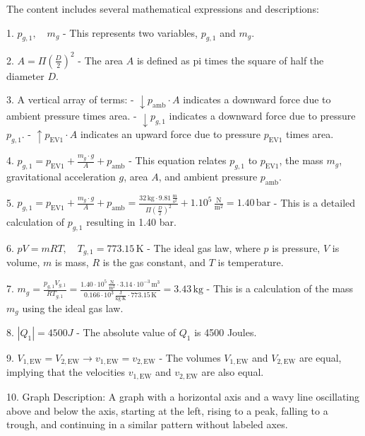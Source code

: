 The content includes several mathematical expressions and descriptions:

1. \( p_{g,1}, \quad m_g \) - This represents two variables, \( p_{g,1} \) and \( m_g \).

2. \( A = \Pi \left( \frac{D}{2} \right)^2 \) - The area \( A \) is defined as pi times the square of half the diameter \( D \).

3. A vertical array of terms:
   - \( \downarrow p_{\text{amb}} \cdot A \) indicates a downward force due to ambient pressure times area.
   - \( \downarrow p_{g,1} \) indicates a downward force due to pressure \( p_{g,1} \).
   - \( \uparrow p_{\text{EV1}} \cdot A \) indicates an upward force due to pressure \( p_{\text{EV1}} \) times area.

4. \( p_{g,1} = p_{\text{EV1}} + \frac{m_g \cdot g}{A} + p_{\text{amb}} \) - This equation relates \( p_{g,1} \) to \( p_{\text{EV1}} \), the mass \( m_g \), gravitational acceleration \( g \), area \( A \), and ambient pressure \( p_{\text{amb}} \).

5. \( p_{g,1} = p_{\text{EV1}} + \frac{m_g \cdot g}{A} + p_{\text{amb}} = \frac{32 \, \text{kg} \cdot 9.81 \, \frac{\text{m}}{\text{s}^2}}{\Pi \left( \frac{D}{2} \right)^2} + 1.10^5 \, \frac{\text{N}}{\text{m}^2} = \boxed{1.40 \, \text{bar}} \) - This is a detailed calculation of \( p_{g,1} \) resulting in 1.40 bar.

6. \( pV = mRT, \quad T_{g,1} = 773.15 \, \text{K} \) - The ideal gas law, where \( p \) is pressure, \( V \) is volume, \( m \) is mass, \( R \) is the gas constant, and \( T \) is temperature.

7. \( m_g = \frac{p_{g,1} V_{g,1}}{R T_{g,1}} = \frac{1.40 \cdot 10^5 \, \frac{\text{N}}{\text{m}^2} \cdot 3.14 \cdot 10^{-3} \, \text{m}^3}{0.166 \cdot 10^3 \, \frac{\text{J}}{\text{kg} \cdot \text{K}} \cdot 773.15 \, \text{K}} = 3.43 \, \text{kg} \) - This is a calculation of the mass \( m_g \) using the ideal gas law.

8. \( \left|Q_1\right| = 4500 J \) - The absolute value of \( Q_1 \) is 4500 Joules.

9. \( V_{1, \text{EW}} = V_{2, \text{EW}} \rightarrow v_{1, \text{EW}} = v_{2, \text{EW}} \) - The volumes \( V_{1, \text{EW}} \) and \( V_{2, \text{EW}} \) are equal, implying that the velocities \( v_{1, \text{EW}} \) and \( v_{2, \text{EW}} \) are also equal.

10. Graph Description: A graph with a horizontal axis and a wavy line oscillating above and below the axis, starting at the left, rising to a peak, falling to a trough, and continuing in a similar pattern without labeled axes.

